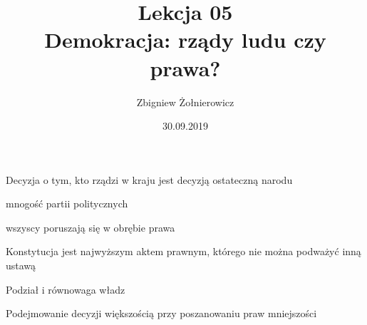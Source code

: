 \documentclass[a4paper]{article}
\begin{document}
\title{{\huge Lekcja 05} \\
{\large Demokracja: rządy ludu czy prawa?}}
\author{Zbigniew Żołnierowicz}
\date{30.09.2019}
\maketitle
\begin{description}
    \item[Zasada suwerenności narodu] Decyzja o tym, kto rządzi w kraju jest decyzją ostateczną narodu
    \item[Pluralizm] mnogość partii politycznych
    \item[Zasada praworządności] wszyscy poruszają się w obrębie prawa
    \item[Konstytucjonalizm] Konstytucja jest najwyższym aktem prawnym, którego nie można podważyć inną ustawą
    \item Podział i równowaga władz
    \item Podejmowanie decyzji większością przy poszanowaniu praw mniejszości
\end{description}
\end{document}
